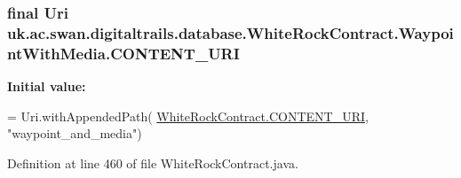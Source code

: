 \hypertarget{classuk_1_1ac_1_1swan_1_1digitaltrails_1_1database_1_1_white_rock_contract_1_1_waypoint_with_media_afadd98ebefd7854d33ec07f74e5261dc}{
\subsubsection[{C\+O\+N\+T\+E\+N\+T\+\_\+\+U\+R\+I}]{\setlength{\rightskip}{0pt plus 5cm}final Uri uk.\+ac.\+swan.\+digitaltrails.\+database.\+White\+Rock\+Contract.\+Waypoint\+With\+Media.\+C\+O\+N\+T\+E\+N\+T\+\_\+\+U\+R\+I\hspace{0.3cm}{\ttfamily [static]}}}\label{classuk_1_1ac_1_1swan_1_1digitaltrails_1_1database_1_1_white_rock_contract_1_1_waypoint_with_media_afadd98ebefd7854d33ec07f74e5261dc}
{\bfseries Initial value\+:}
\begin{DoxyCode}
= Uri.withAppendedPath(
                \hyperlink{classuk_1_1ac_1_1swan_1_1digitaltrails_1_1database_1_1_white_rock_contract_abfe96759bfe16773a98099536eef2306}{WhiteRockContract.CONTENT\_URI}, \textcolor{stringliteral}{"waypoint\_and\_media"})
\end{DoxyCode}


Definition at line 460 of file White\+Rock\+Contract.\+java.

